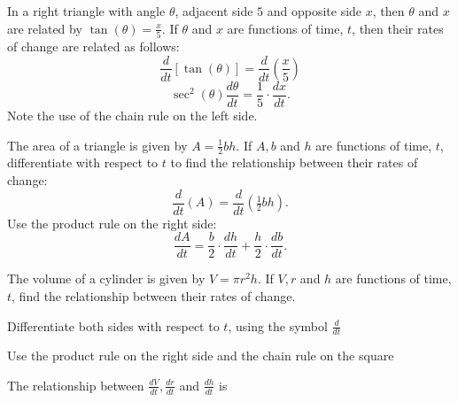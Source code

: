 \documentclass{ximera}
\begin{document}
\begin{example}
In a right triangle with angle $\theta$, adjacent side $5$ and opposite side $x$, then 
$\theta$ and $x$ are related by $\tan (\theta) = \frac{x}{5}$. If $\theta$ and $x$ are functions of time, $t$, 
then their rates of change are related as follows:
\[\frac{d}{dt}[\tan (\theta)] = \frac{d}{dt} \left(\frac{x}{5}\right)\]
\[\sec^2(\theta) \frac{d\theta}{dt} = \frac{1}{5} \cdot \frac{dx}{dt}.\]
Note the use of the chain rule on the left side.
\end{example}



\begin{example}
The area of a triangle is given by $A = \frac{1}{2} bh$. If $A, b$ and $h$ are functions of time, $t$, 
differentiate with respect to $t$ to find the relationship between their rates of change:
\[\frac{d}{dt}(A) = \frac{d}{dt}(\tfrac{1}{2} bh).\]
Use the product rule on the right side:
\[\frac{dA}{dt} = \frac{b}{2} \cdot \frac{dh}{dt}+ \frac{h}{2} \cdot \frac{db}{dt}.\]
\end{example}

\begin{question}
The volume of a cylinder is given by $V = \pi r^2h$. If $V, r$ and $h$ are functions of time, $t$,
find the relationship between their rates of change.\\
\begin{hint}
Differentiate both sides with respect to $t$, using the symbol $\frac{d}{dt}$
\end{hint}
\begin{hint}
Use the product rule on the right side and the chain rule on the square
\end{hint}

The relationship between $\frac{dV}{dt}, \frac{dr}{dt}$ and $\frac{dh}{dt}$ is
\begin{multipleChoice}
\end{multipleChoice}
\end{question}
\end{document}
